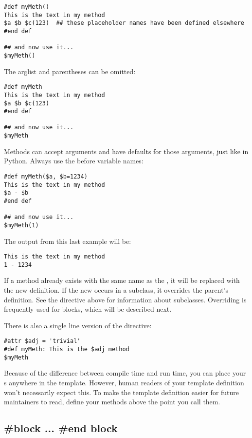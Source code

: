 \begin{verbatim}
#def myMeth()
This is the text in my method 
$a $b $c(123)  ## these placeholder names have been defined elsewhere
#end def

## and now use it...
$myMeth()
\end{verbatim}

The arglist and parentheses can be omitted:
\begin{verbatim}
#def myMeth
This is the text in my method 
$a $b $c(123)
#end def

## and now use it...
$myMeth
\end{verbatim}

Methods can accept arguments and have defaults for those arguments, just like
in Python.  Always use the \code{\$} before variable names:
\begin{verbatim}
#def myMeth($a, $b=1234)
This is the text in my method 
$a - $b
#end def

## and now use it...
$myMeth(1)
\end{verbatim}

The output from this last example will be:

\begin{verbatim}
This is the text in my method 
1 - 1234
\end{verbatim}

If a method already exists with the same name as the , it will be
replaced with the new definition.  If the new  occurs in a
subclass, it overrides the parent's definition.  See the 
directive above for information about subclasses.  Overriding is frequently
used for blocks, which will be described next.

There is also a single line version of the  directive:

\begin{verbatim}
#attr $adj = 'trivial'
#def myMeth: This is the $adj method 
$myMeth
\end{verbatim}

Because of the difference between compile time and run time, you can place
your s anywhere in the template.  However, human readers of your
template definition won't necessarily expect this.  To make the template
definition easier for future maintainers to read, define your methods above
the point you call them.


\subsection{\#block ... \#end block}
\label{inheritanceEtc.block}


